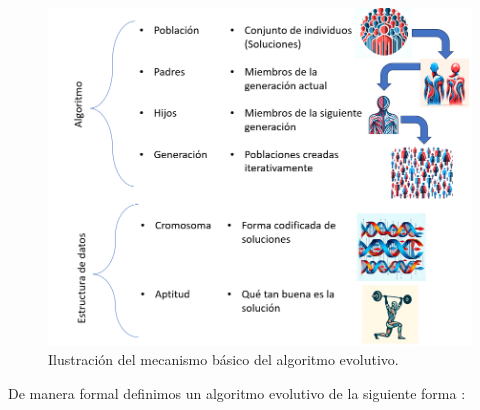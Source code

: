 \begin{figure}[H]
    \centering
    \includegraphics[width=\textwidth]{Figuras/AE_parts_algorithm.png}
    \caption{Ilustración del mecanismo básico del algoritmo evolutivo. }
    \label{fig:EA_mech}
\end{figure}

De manera formal definimos un algoritmo evolutivo de la siguiente forma \cite{coelloEvolutionaryAlgorithmsSolving}:


